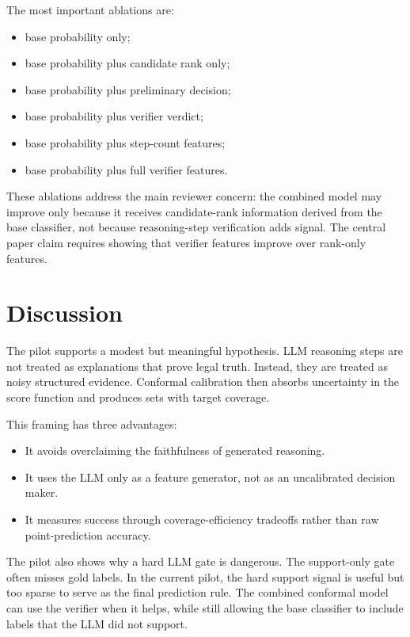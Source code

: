 \documentclass[11pt]{article}
\begin{document}
The most important ablations are:
\begin{itemize}
  \item base probability only;
  \item base probability plus candidate rank only;
  \item base probability plus preliminary decision;
  \item base probability plus verifier verdict;
  \item base probability plus step-count features;
  \item base probability plus full verifier features.
\end{itemize}

These ablations address the main reviewer concern: the combined model may improve only because it receives candidate-rank information derived from the base classifier, not because reasoning-step verification adds signal. The central paper claim requires showing that verifier features improve over rank-only features.

\section{Discussion}

The pilot supports a modest but meaningful hypothesis. LLM reasoning steps are not treated as explanations that prove legal truth. Instead, they are treated as noisy structured evidence. Conformal calibration then absorbs uncertainty in the score function and produces sets with target coverage.

This framing has three advantages:
\begin{itemize}
  \item It avoids overclaiming the faithfulness of generated reasoning.
  \item It uses the LLM only as a feature generator, not as an uncalibrated decision maker.
  \item It measures success through coverage-efficiency tradeoffs rather than raw point-prediction accuracy.
\end{itemize}

The pilot also shows why a hard LLM gate is dangerous. The support-only gate often misses gold labels. In the current pilot, the hard support signal is useful but too sparse to serve as the final prediction rule. The combined conformal model can use the verifier when it helps, while still allowing the base classifier to include labels that the LLM did not support.
\end{document}
